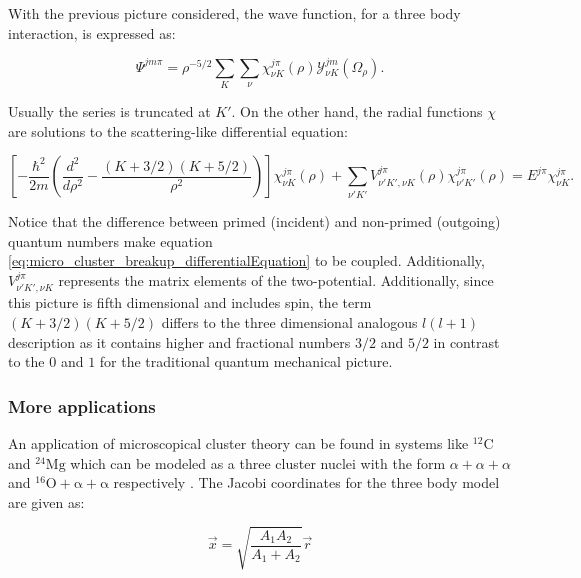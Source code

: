 \documentclass[openany]{book}
\begin{document}
With the previous picture considered, the wave function, for a three body interaction, is expressed as: 

\begin{equation}\label{eq:micro_cluster_breakup_wavefunction_complete}
	\Psi^{jm\pi} = {\rho}^{-5/2} \sum_{K} \sum_{\nu} {\chi^{j\pi}_{\nu K} (\rho) \mathcal{Y}^{jm}_{\nu K} (\Omega_{\rho})}.
\end{equation}

Usually the series is truncated at $K'$. On the other hand, the radial functions $\chi$ are solutions to the scattering-like differential equation: 

\begin{equation}\label{eq:micro_cluster_breakup_differentialEquation}
	\left[ -\frac{\hbar^2}{2m} \left( \frac{d^2}{d\rho^2} - \frac{(K + 3/2)(K + 5/2)}{\rho^2}  \right)   \right ] \chi^{j\pi}_{\nu K} (\rho)   + \sum_{\nu' K'} V^{j\pi}_{\nu' K', \nu K}(\rho) \chi^{j\pi}_{\nu'K'}(\rho) = E^{j\pi}  \chi^{j\pi}_{\nu K}.
\end{equation}

Notice that the difference between primed (incident) and non-primed (outgoing) quantum numbers make equation \ref{eq:micro_cluster_breakup_differentialEquation} to be coupled. Additionally, $V^{j\pi}_{\nu' K', \nu K}$ represents the matrix elements of the two-potential. Additionally, since this picture is fifth dimensional and includes spin, the term $(K + 3/2)(K + 5/2)$ differs to the three dimensional analogous $l(l +1)$ description as it contains higher and fractional numbers $3/2$ and $5/2$ in contrast to the $0$ and $1$ for the traditional quantum mechanical picture. \\

\subsubsection{More applications} \label{ssub:micro_cluster_moreApplications}

An application of microscopical cluster theory can be found in systems like $\mathrm{{}^{12}C}$ and $\mathrm{{}^{24}Mg}$ which can be modeled as a three cluster nuclei with the form $\alpha + \alpha + \alpha$ and $\mathrm{{}^{16}O + \alpha + \alpha}$ respectively  \cite{descouvemont_2021}. The Jacobi coordinates for the three body model are given as: 

\begin{equation}\label{eq:middleFusion_threeBody_cluster_x}
	\vec x = \sqrt{ \frac{A_1A_2}{A_1 + A_2}} \vec r 
\end{equation}
\end{document}

